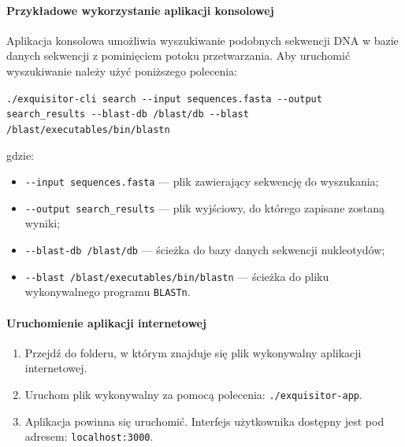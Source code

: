             \paragraph{Przykładowe wykorzystanie aplikacji konsolowej}

                Aplikacja konsolowa umożliwia wyszukiwanie podobnych sekwencji DNA w bazie danych sekwencji z pominięciem potoku przetwarzania. Aby uruchomić wyszukiwanie należy użyć poniższego polecenia:

                \texttt{./exquisitor-cli search -\phantom{}-input sequences.fasta -\phantom{}-output search\_results -\phantom{}-blast-db /blast/db -\phantom{}-blast /blast/executables/bin/blastn}

                gdzie:
                \begin{itemize}
                    \item {
                        \texttt{-\phantom{}-input sequences.fasta} — plik zawierający sekwencję do wyszukania;
                    }
                    \item {
                        \texttt{-\phantom{}-output search\_results} — plik wyjściowy, do którego zapisane zostaną wyniki;
                    }
                    \item {
                        \texttt{-\phantom{}-blast-db /blast/db} — ścieżka do bazy danych sekwencji nukleotydów;
                    }
                    \item {
                        \texttt{-\phantom{}-blast /blast/executables/bin/blastn} — ścieżka do pliku wykonywalnego programu \texttt{BLASTn}.
                    }
                \end{itemize}

            \paragraph{Uruchomienie aplikacji internetowej}

                \begin{enumerate}
                    \item {
                        Przejdź do folderu, w którym znajduje się plik wykonywalny aplikacji internetowej.
                    }
                    \item {
                        Uruchom plik wykonywalny za pomocą polecenia: \texttt{./exquisitor-app}.
                    }
                    \item {
                        Aplikacja powinna się uruchomić. Interfejs użytkownika dostępny jest pod adresem:
                        \texttt{localhost:3000}.
                    }
                \end{enumerate}

